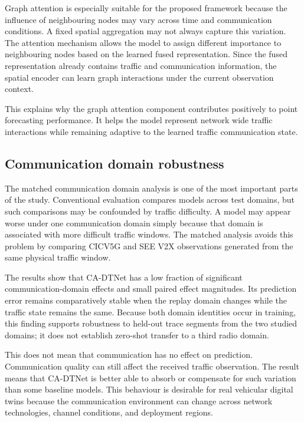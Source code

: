 \documentclass[pdflatex,sn-mathphys-num]{sn-jnl}%
\theoremstyle{thmstyleone}%
\theoremstyle{thmstyletwo}%
\theoremstyle{thmstylethree}%
\begin{document}
Graph attention is especially suitable for the proposed framework because the influence of neighbouring nodes may vary across time and communication conditions. A fixed spatial aggregation may not always capture this variation. The attention mechanism allows the model to assign different importance to neighbouring nodes based on the learned fused representation. Since the fused representation already contains traffic and communication information, the spatial encoder can learn graph interactions under the current observation context.

This explains why the graph attention component contributes positively to point forecasting performance. It helps the model represent network wide traffic interactions while remaining adaptive to the learned traffic communication state.

\subsection{Communication domain robustness}
\label{subsec:discussion_domain_robustness}

The matched communication domain analysis is one of the most important parts of the study. Conventional evaluation compares models across test domains, but such comparisons may be confounded by traffic difficulty. A model may appear worse under one communication domain simply because that domain is associated with more difficult traffic windows. The matched analysis avoids this problem by comparing CICV5G and SEE V2X observations generated from the same physical traffic window.

The results show that CA-DTNet has a low fraction of significant communication-domain effects and small paired effect magnitudes. Its prediction error remains comparatively stable when the replay domain changes while the traffic state remains the same. Because both domain identities occur in training, this finding supports robustness to held-out trace segments from the two studied domains; it does not establish zero-shot transfer to a third radio domain.

This does not mean that communication has no effect on prediction. Communication quality can still affect the received traffic observation. The result means that CA-DTNet is better able to absorb or compensate for such variation than some baseline models. This behaviour is desirable for real vehicular digital twins because the communication environment can change across network technologies, channel conditions, and deployment regions.
\end{document}
